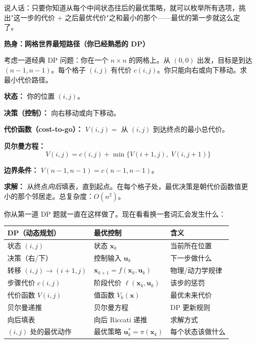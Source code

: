 说人话：只要你知道从每个中间状态往后的最优策略，就可以枚举所有选项，挑出"这一步的代价 + 之后最优代价"之和最小的那个——最优的第一步就这么定了。

\vspace{0.5em}
\begin{mdframed}[linewidth=1pt, innertopmargin=10pt, innerbottommargin=10pt]
\textbf{热身：网格世界最短路径（你已经熟悉的 DP）}

\vspace{0.3em}
考虑一道经典 DP 问题：你在一个 $n \times n$ 的网格上。从 $(0, 0)$ 出发，目标是到达 $(n{-}1, n{-}1)$。每个格子 $(i, j)$ 有代价 $c(i, j)$。你只能向右或向下移动。求最小代价路径。

\textbf{状态：} 你的位置 $(i, j)$。

\textbf{决策（控制）：} 向右移动或向下移动。

\textbf{代价函数（cost-to-go）：} $V(i, j) = $ 从 $(i, j)$ 到达终点的最小总代价。

\textbf{贝尔曼方程：}
\[
V(i, j) = c(i, j) + \min\{V(i+1, j), \; V(i, j+1)\}
\]

\textbf{边界条件：} $V(n{-}1, n{-}1) = c(n{-}1, n{-}1)$。

\textbf{求解：} 从终点\textit{向后}填表，直到起点。在每个格子处，最优决策是朝代价函数值更小的那个邻居走。总复杂度：$O(n^2)$。

你从第一道 DP 题就一直在这样做了。现在看看换一套词汇会发生什么：

\begin{center}
\begin{tabular}{lll}
\toprule
\textbf{DP（动态规划）} & \textbf{最优控制} & \textbf{含义} \\
\midrule
状态 $(i, j)$ & 状态 $\mathbf{x}_k$ & 当前所在位置 \\
决策（右/下） & 控制输入 $\mathbf{u}_k$ & 下一步做什么 \\
转移 $(i,j) \to (i+1,j)$ & $\mathbf{x}_{k+1} = f(\mathbf{x}_k, \mathbf{u}_k)$ & 物理/动力学规律 \\
步骤代价 $c(i,j)$ & 阶段代价 $\ell(\mathbf{x}_k, \mathbf{u}_k)$ & 该步的惩罚 \\
代价函数 $V(i,j)$ & 值函数 $V_k(\mathbf{x})$ & 最优未来代价 \\
贝尔曼递推 & 贝尔曼方程 & DP 更新规则 \\
向后填表 & 向后 Riccati 递推 & 求解方式 \\
$(i,j)$ 处的最优动作 & 最优策略 $\mathbf{u}_k^* = \pi(\mathbf{x}_k)$ & 每个状态该做什么 \\
\bottomrule
\end{tabular}
\end{center}


\end{mdframed}

